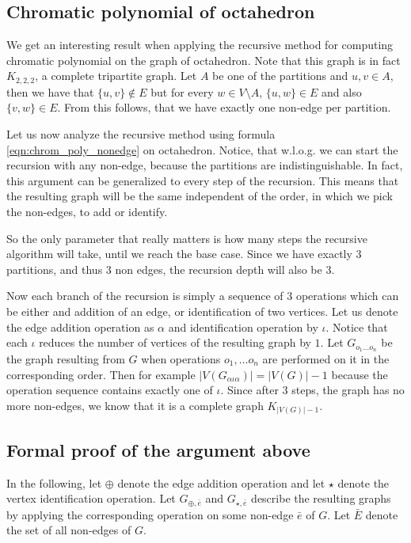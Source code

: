 \begin{highlight}

\subsection{Chromatic polynomial of octahedron}

We get an interesting result when applying the recursive method for computing chromatic polynomial on the graph of octahedron. Note that this graph is in fact $K_{2,2,2}$, a complete tripartite graph. Let $A$ be one of the partitions and $u,v \in A$, then we have that $\{u,v\} \notin E$ but for every $w \in V \setminus A$, $\{u,w\} \in E$ and also $\{v,w\} \in E$. From this follows, that we have exactly one non-edge per partition.

Let us now analyze the recursive method using formula \ref{eqn:chrom_poly_nonedge} on octahedron. Notice, that w.l.o.g. we can start the recursion with any non-edge, because the partitions are indistinguishable. In fact, this argument can be generalized to every step of the recursion. This means that the resulting graph will be the same independent of the order, in which we pick the non-edges, to add or identify.

So the only parameter that really matters is how many steps the recursive algorithm will take, until we reach the base case. Since we have exactly $3$ partitions, and thus $3$ non edges, the recursion depth will also be $3$.

Now each branch of the recursion is simply a sequence of $3$ operations which can be either and addition of an edge, or identification of two vertices. Let us denote the edge addition operation as $\alpha$ and identification operation by $\iota$. Notice that each $\iota$ reduces the number of vertices of the resulting graph by $1$. Let $G_{o_1 \ldots o_n}$ be the graph resulting from $G$ when operations $o_1, \ldots o_n$ are performed on it in the corresponding order. Then for example $|V(G_{\alpha \iota\alpha})| = |V(G)| -1$ because the operation sequence contains exactly one of $\iota$. Since after $3$ steps, the graph has no more non-edges, we know that it is a complete graph $K_{|V(G)|-1}$. 

\subsection{Formal proof of the argument above}

In the following, let $\oplus$ denote the edge addition operation and let $\star$ denote the vertex identification operation. Let $G_{\oplus,\bar{e}}$ and $G_{\star,\bar{e}}$ describe the resulting graphs by applying the corresponding operation on some non-edge $\bar{e}$ of $G$. Let $\bar{E}$ denote the set of all non-edges of $G$.



\end{highlight}
